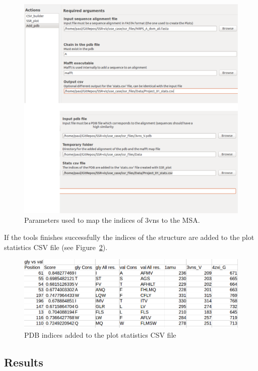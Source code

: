 \documentclass[a4paper,10pt]{article}
\begin{document}
\begin{figure}
  \includegraphics[width=\linewidth]{./figs/Add_pdb}
  \caption{Parameters used to map the indices of 3vns to the MSA.}
  \label{fig:Add_pdb}
\end{figure}

If the tools finishes successfully the indices of the structure are added to the plot statistics CSV file (see Figure~\ref{fig:added_pdb}).

\begin{figure}
  \includegraphics[width=\linewidth]{./figs/added_pdb}
  \caption{PDB indices added to the plot statistics CSV file}
  \label{fig:added_pdb}
\end{figure}

\subsection{Results}
\end{document}
